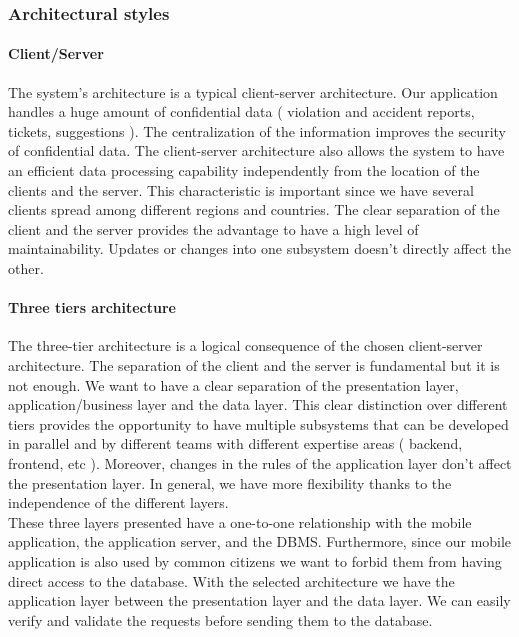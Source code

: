 \documentclass[./main.tex]{subfiles}
\begin{document}
\subsubsection{Architectural styles}
\paragraph*{Client/Server}

The system's architecture is a typical client-server architecture. Our application handles a huge amount of confidential data ( violation and accident reports, tickets, suggestions ). The centralization of the information improves the security of confidential data. The client-server architecture also allows the system to have an efficient data processing capability independently from the location of the clients and the server. This characteristic is important since we have several clients spread among different regions and countries.
The clear separation of the client and the server provides the advantage to have a high level of maintainability. Updates or changes into one subsystem doesn't directly affect the other.

\paragraph*{Three tiers architecture}
The three-tier architecture is a logical consequence of the chosen client-server architecture. The separation of the client and the server is fundamental but it is not enough. We want to have a clear separation of the presentation layer, application/business layer and the data layer. This clear distinction over different tiers provides the opportunity to have multiple subsystems that can be developed in parallel and by different teams with different expertise areas ( backend, frontend, etc ). Moreover, changes in the rules of the application layer don't affect the presentation layer. In general, we have more flexibility thanks to the independence of the different layers. \\These three layers presented have a one-to-one relationship with the mobile application, the application server, and the DBMS. Furthermore, since our mobile application is also used by common citizens we want to forbid them from having direct access to the database. With the selected architecture we have the application layer between the presentation layer and the data layer. We can easily verify and validate the requests before sending them to the database.
\end{document}

